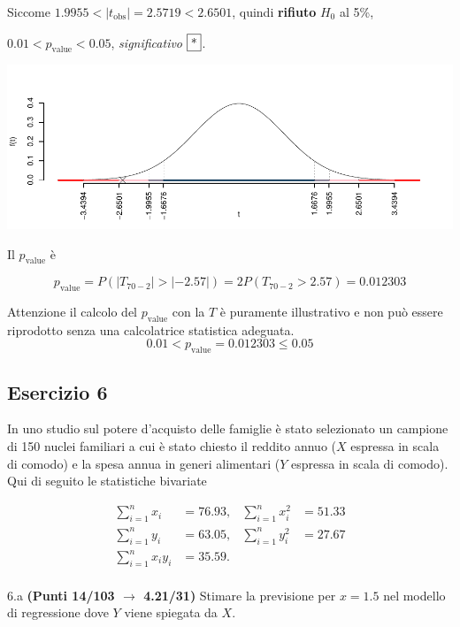 \documentclass[
  11pt,
]{book}
\theoremstyle{mytheoremstyle}
\theoremstyle{mydefstyle}
\newenvironment{sol}
  {
  \begin{tcolorbox}[enhanced,breakable,arc=0.1mm,boxrule=1pt,colback=white,colframe=iblue,
  title=\bf \fontfamily{lmss}\selectfont \hspace{.5 cm} Soluzione,drop fuzzy shadow]

}{
\end{tcolorbox}
  }
\begin{document}
\begin{sol}
Siccome \(1.9955<|t_\text{obs}|=2.5719<2.6501\), quindi \textbf{rifiuto} \(H_0\) al 5\%,

\(0.01<p_\text{value}<0.05\), \emph{significativo} \(\fbox{*}\).

\begin{center}\includegraphics{Esami_passati_con_soluzioni_files/figure-latex/2023-3,-1} \end{center}

Il \(p_{\text{value}}\) è

\[ p_{\text{value}} = P(|T_{70-2}|>|-2.57|)=2P(T_{70-2}>2.57)=0.012303 \]

Attenzione il calcolo del \(p_\text{value}\) con la \(T\) è puramente illustrativo e non può essere riprodotto senza una calcolatrice statistica adeguata.\[
 0.01 < p_\text{value}= 0.012303 \leq 0.05 
\]

\end{sol}

\subsection{Esercizio 6}\label{esercizio-6-17}

In uno studio sul potere d'acquisto delle famiglie è stato selezionato un campione di 150 nuclei familiari
a cui è stato chiesto il reddito annuo (\(X\) espressa in scala di comodo) e la spesa annua in generi alimentari (\(Y\) espressa in scala di comodo). Qui di seguito le statistiche bivariate

\begin{align*}
\sum_{i=1}^n x_i &= 76.93,   &\sum_{i=1}^n x_i^2 &= 51.33 \\
\sum_{i=1}^n y_i &= 63.05,   &\sum_{i=1}^n y_i^2 &= 27.67 \\
\sum_{i=1}^n x_iy_i &= 35.59.    \\
\end{align*}

6.a \textbf{(Punti 14/103 \(\rightarrow\) 4.21/31)} Stimare la previsione per \(x=1.5\) nel modello di regressione dove \(Y\) viene spiegata da \(X\).
\end{document}
